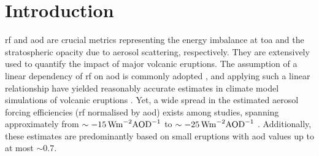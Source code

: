 \documentclass{ametsocV6.1}
\begin{document}

\section{Introduction}



\Gls{rf} and \gls{aod} are crucial metrics representing the energy imbalance at
\gls{toa} and the stratospheric opacity due to aerosol scattering, respectively. They
are extensively used to quantify the impact of major volcanic eruptions. The assumption
of a linear dependency of \gls{rf} on \gls{aod} is commonly adopted
\citep{myhre2013,andersson2015}, and applying such a linear relationship have yielded
reasonably accurate estimates in climate model simulations of volcanic eruptions
\citep{mills2017,hansen2005,gregory2016,marshall2020,pitari2016b}. Yet, a wide spread in
the estimated aerosol forcing efficiencies (\gls{rf} normalised by \gls{aod}) exists
among studies, spanning approximately from \(\sim
\SI{-15}{\watt\metre^{-2}\ce{AOD}^{-1}}\) \citep{pitari2016b} to \(\sim
\SI{-25}{\watt\metre^{-2}\ce{AOD}^{-1}}\) \citep{myhre2013}. Additionally, these
estimates are predominantly based on small eruptions with \gls{aod} values up to at most
\(\sim 0.7\).
\end{document}
